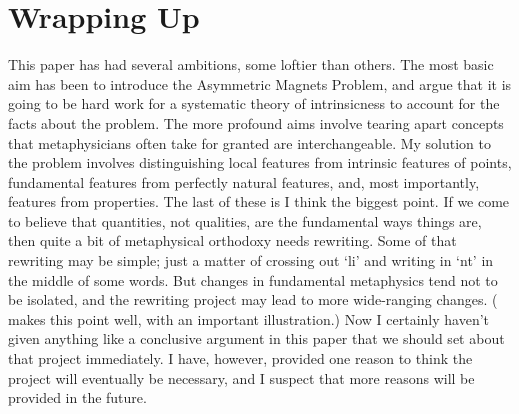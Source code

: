\section{Wrapping Up}

This paper has had several ambitions, some loftier than others. The most basic aim has been to introduce the Asymmetric Magnets Problem, and argue that it is going to be hard work for a systematic theory of intrinsicness to account for the facts about the problem. The more profound aims involve tearing apart concepts that metaphysicians often take for granted are interchangeable. My solution to the problem involves distinguishing local features from intrinsic features of points, fundamental features from perfectly natural features, and, most importantly, features from properties. The last of these is I think the biggest point. If we come to believe that quantities, not qualities, are the fundamental ways things are, then quite a bit of metaphysical orthodoxy needs rewriting. Some of that rewriting may be simple; just a matter of crossing out `li' and writing in `nt' in the middle of some words. But changes in fundamental metaphysics tend not to be isolated, and the rewriting project may lead to more wide-ranging changes. (\citet{Egan2004-JACSPA-2} makes this point well, with an important illustration.) Now I certainly haven't given anything like a conclusive argument in this paper that we should set about that project immediately. I have, however, provided one reason to think the project will eventually be necessary, and I suspect that more reasons will be provided in the future.
%







